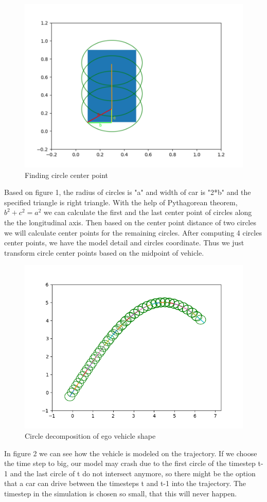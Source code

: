 \documentclass[conference]{IEEEtran}
\begin{document}
\begin{figure}[h]
\includegraphics[scale = 0.3]{./images/egoVehicle.png}
\caption{Finding circle center point}
\end{figure}

Based on figure 1, the radius of circles is "a" and width of car is "2*b" and the specified triangle is right triangle. With the help of Pythagorean theorem, $b^2+c^2=a^2$ we can calculate the first and the last center point of circles along the the longitudinal axis. Then based on the center point distance of two circles we will calculate center points for the remaining circles. After computing 4 circles center points, we have the model detail and circles coordinate. Thus we just transform circle center points based on the midpoint of vehicle.

\begin{figure}[h]
\includegraphics[scale = 0.5]{./images/sincarshape.png}
\caption{Circle decomposition of ego vehicle shape}
\end{figure}
In figure 2 we can see how the vehicle is modeled on the trajectory. If we choose the time step to big, our model may crash due to the first circle of the timestep t-1 and the last circle of t do not intersect anymore, so there might be the option that a car can drive between the timesteps t and t-1 into the trajectory. The timestep in the simulation is chosen so small, that this will never happen.
\end{document}
